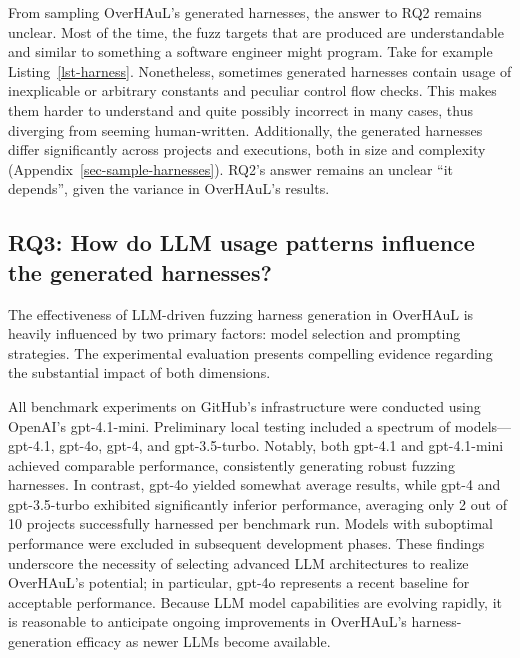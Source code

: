 \documentclass[
  a4paper,
]{scrreprt}
\theoremstyle{definition}
\theoremstyle{remark}
\begin{document}
From sampling OverHAuL's generated harnesses, the answer to RQ2 remains
unclear. Most of the time, the fuzz targets that are produced are
understandable and similar to something a software engineer might
program. Take for example Listing~\ref{lst-harness}. Nonetheless,
sometimes generated harnesses contain usage of inexplicable or arbitrary
constants and peculiar control flow checks. This makes them harder to
understand and quite possibly incorrect in many cases, thus diverging
from seeming human-written. Additionally, the generated harnesses differ
significantly across projects and executions, both in size and
complexity (Appendix~\ref{sec-sample-harnesses}). RQ2's answer remains
an unclear ``it depends'', given the variance in OverHAuL's results.

\subsection{RQ3: How do LLM usage patterns influence the generated
harnesses?}\label{rq3-how-do-llm-usage-patterns-influence-the-generated-harnesses}

The effectiveness of LLM-driven fuzzing harness generation in OverHAuL
is heavily influenced by two primary factors: model selection and
prompting strategies. The experimental evaluation presents compelling
evidence regarding the substantial impact of both dimensions.

All benchmark experiments on GitHub's infrastructure were conducted
using OpenAI's gpt-4.1-mini. Preliminary local testing included a
spectrum of models---gpt-4.1, gpt-4o, gpt-4, and gpt-3.5-turbo. Notably,
both gpt-4.1 and gpt-4.1-mini achieved comparable performance,
consistently generating robust fuzzing harnesses. In contrast, gpt-4o
yielded somewhat average results, while gpt-4 and gpt-3.5-turbo
exhibited significantly inferior performance, averaging only 2 out of 10
projects successfully harnessed per benchmark run. Models with
suboptimal performance were excluded in subsequent development phases.
These findings underscore the necessity of selecting advanced LLM
architectures to realize OverHAuL's potential; in particular, gpt-4o
represents a recent baseline for acceptable performance. Because LLM
model capabilities are evolving rapidly, it is reasonable to anticipate
ongoing improvements in OverHAuL's harness-generation efficacy as newer
LLMs become available.
\end{document}
